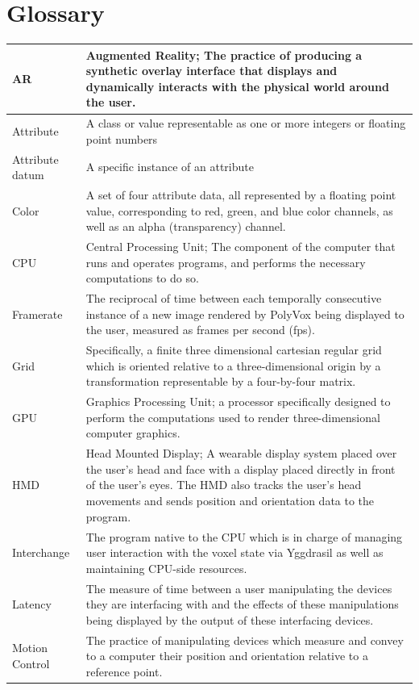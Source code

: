 \documentclass[onecolumn, draftclsnofoot,10pt, compsoc]{IEEEtran}
\begin{document}
\section{Glossary}
\begin{longtable}{ | l | p{12cm} | }
 \hline			
AR & Augmented Reality; The practice of producing a synthetic overlay interface that displays and dynamically interacts with the physical world around the user. \\ \hline 
Attribute & A class or value representable as one or more integers or floating point numbers  \\ \hline
Attribute datum & A specific instance of an attribute  \\ \hline
Color & A set of four attribute data, all represented by a floating point value, corresponding to red, green, and blue color channels, as well as an alpha (transparency) channel.  \\ \hline
CPU & Central Processing Unit; The component of the computer that runs and operates programs, and performs the necessary computations to do so.  \\ \hline
Framerate & The reciprocal of time between each temporally consecutive instance of a new image rendered by PolyVox being displayed to the user, measured as frames per second (fps). \\ \hline 
Grid &  Specifically, a finite three dimensional cartesian regular grid which is oriented relative to a three-dimensional origin by a transformation representable by a four-by-four matrix. \\ \hline
GPU & Graphics Processing Unit; a processor specifically designed to perform the computations used to render three-dimensional computer graphics.  \\ \hline
HMD & Head Mounted Display; A wearable display system placed over the user’s head and face with a display placed directly in front of the user’s eyes. The HMD also tracks the user’s head movements and sends position and orientation data to the program.  \\ \hline
Interchange & The program native to the CPU which is in charge of managing user interaction with the voxel state via Yggdrasil as well as maintaining CPU-side resources. \\ \hline
Latency & The measure of time between a user manipulating the devices they are interfacing with and the effects of these manipulations being displayed by the output of these interfacing devices. \\ \hline
Motion Control & The practice of manipulating devices which measure and convey to a computer their position and orientation relative to a reference point.  \\ \hline

\end{longtable}
\end{document}
